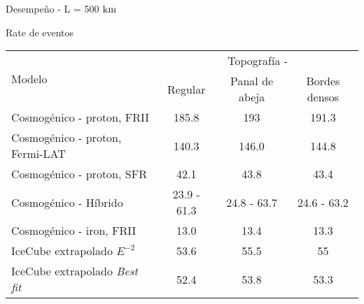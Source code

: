 \begin{frame}{Desempe\~no - L = 500 ${\rm km}$}
	\begin{block}{Rate de eventos}
		\begin{center}
		\renewcommand{\arraystretch}{1.3}
		\footnotesize
		\begin{tabular}{lccc}
			\hline
			\multirow{2}{*}{Modelo} & \multicolumn{3}{c}{Topograf\'ia - \cant{L=500}{km}} \\
			&   Regular &   Panal de abeja &   Bordes densos \\
			\hline
			Cosmogénico - proton, FRII &    185.8 &            193   &           191.3 \\
			Cosmogénico - proton, Fermi-LAT &     140.3 &             146.0 &           144.8 \\
			Cosmogénico - proton, SFR &     42.1 &             43.8   &            43.4 \\
			Cosmogénico - H\'ibrido &  23.9 - 61.3 &   24.8 - 63.7 &  24.6 - 63.2 \\
			Cosmogénico - iron, FRII &     13.0   &        13.4 &            13.3 \\
			IceCube extrapolado $E^{-2}$ &      53.6 &         55.5   &            55   \\
			IceCube extrapolado \emph{Best fit} &    52.4 &  53.8  &   53.3 \\
			\hline
		\end{tabular}
		\end{center}
	\end{block}
\end{frame}

